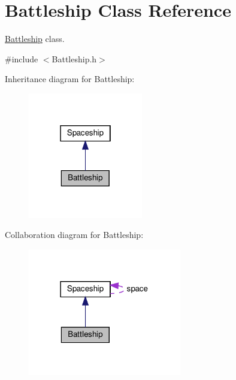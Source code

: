 \hypertarget{classBattleship}{}\section{Battleship Class Reference}
\label{classBattleship}


\hyperlink{classBattleship}{Battleship} class.  




{\ttfamily \#include $<$Battleship.\+h$>$}



Inheritance diagram for Battleship\+:\nopagebreak
\begin{figure}[H]
\begin{center}
\leavevmode
\includegraphics[width=142pt]{classBattleship__inherit__graph}
\end{center}
\end{figure}


Collaboration diagram for Battleship\+:\nopagebreak
\begin{figure}[H]
\begin{center}
\leavevmode
\includegraphics[width=190pt]{classBattleship__coll__graph}
\end{center}
\end{figure}
